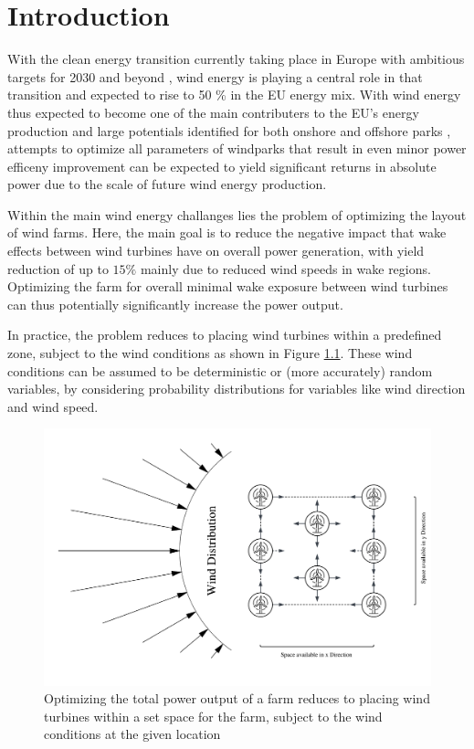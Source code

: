
\chapter{Introduction}\label{chapter:introduction}


With the clean energy transition currently taking place in Europe with ambitious targets for 2030 and beyond \cite{EU_RE_Targets_2023}, wind energy is playing a central role in that transition and expected to rise to 50 \% in the EU energy mix. \cite{ConsiliumEU_Harnessing_Wind_Power_2024}
With wind energy thus expected to become one of the main contributers to the EU's energy production and large potentials identified for both onshore and offshore parks \cite{EEA_Wind_Energy_Potential_2009}, attempts to optimize all parameters of windparks that result in even minor power efficeny improvement can be expected to yield significant returns in absolute power due to the scale of future wind energy production. 

Within the main wind energy challanges lies the problem of optimizing the layout of wind farms. Here, the main goal is to reduce the negative impact that wake effects between wind turbines have on overall power generation, with yield reduction of up to $15\%$  mainly due to reduced wind speeds in wake regions. Optimizing the farm for overall minimal wake exposure between wind turbines can thus potentially significantly increase the power output. \cite{hou_review_2019} \cite{KIM2024123383} 

In practice, the problem reduces to placing wind turbines within a predefined zone, subject to the wind conditions as shown in Figure \ref{fig:intro_plot}. These wind conditions can be assumed to be deterministic or (more accurately) random variables, by considering probability distributions for variables like wind direction and wind speed.


\begin{figure}[h] 
	\centering
	\includegraphics[width=1\textwidth]{figures/introduction/intro_plot.png} 
	\caption{Optimizing the total power output of a farm reduces to placing wind turbines within a set space for the farm, subject to the wind conditions at the given location}
	\label{fig:intro_plot}
\end{figure}

